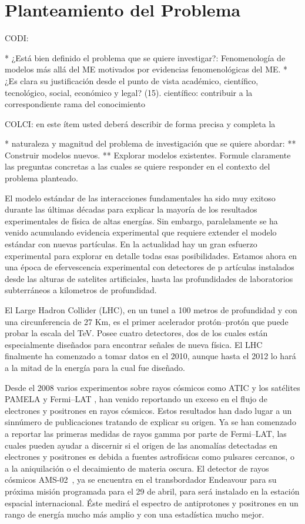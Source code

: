 \section{Planteamiento del Problema }
\begin{instrucciones}
  CODI: 

  * ¿Está bien definido el problema que se quiere investigar?:
  Fenomenología de modelos más allá del ME motivados por evidencias
  fenomenológicas del ME.  
  * ¿Es clara su justificación desde el punto de vista académico,
  científico, tecnológico, social, económico y legal? (15).
  científico: contribuir a la correspondiente rama del conocimiento

  COLCI: en este ítem usted deberá describir de forma precisa y completa la
  
  * naturaleza y magnitud del problema de investigación que se quiere
  abordar:
  ** Construir modelos nuevos.
  ** Explorar modelos existentes.
  Formule claramente las preguntas concretas a las cuales se
  quiere responder en el contexto del problema planteado.
\end{instrucciones}
El modelo estándar de las interacciones fundamentales ha sido muy
exitoso durante las últimas décadas para explicar la mayoría de los
resultados experimentales de física de altas energías. Sin embargo,
paralelamente se ha venido acumulando evidencia experimental que
requiere extender el modelo estándar con nuevas partículas. En la
actualidad hay un gran esfuerzo experimental para explorar en detalle
todas esas posibilidades. Estamos ahora en una época de efervescencia
experimental con detectores de p
artículas instalados desde las alturas
de satelites artificiales, hasta las profundidades de laboratorios
subterráneos a kilometros de profundidad. 

El Large Hadron Collider (LHC), en un tunel a 100 metros de profundidad y
con una circunferencia de 27 Km, es el primer acelerador
protón--protón que puede probar la escala del TeV.  Posee cuatro
detectores, dos de los cuales están especialmente diseñados para
encontrar señales de nueva física. El LHC finalmente ha comenzado a
tomar datos en el 2010, aunque hasta el 2012 lo hará a la mitad de la
energía para la cual fue diseñado.

Desde el 2008 varios experimentos sobre rayos cósmicos como ATIC
\cite{:2008zzr} y los satélites PAMELA \cite{Adriani:2008zr} y
Fermi--LAT \cite{Abdo:2009zk}, han venido reportando un exceso en el
flujo de electrones y positrones en rayos cósmicos. Estos resultados
han dado lugar a un sinnúmero de publicaciones tratando de explicar su
origen. Ya se han comenzado a reportar las primeras medidas de rayos
gamma por parte de Fermi--LAT, las cuales pueden ayudar a discernir si
el origen de las anomalías detectadas en electrones y positrones es
debida a fuentes astrofísicas como pulsares cercanos, o a la
aniquilación o el decaimiento de materia oscura. El detector de rayos
cósmicos AMS-02~\cite{ams:2009}, ya se encuentra en el transbordador
Endeavour para su próxima misión programada para el 29 de abril, para
será instalado en la estación espacial internacional. Éste medirá el
espectro de antiprotones y positrones en un rango de energía mucho más
amplio y con una estadística mucho mejor.

